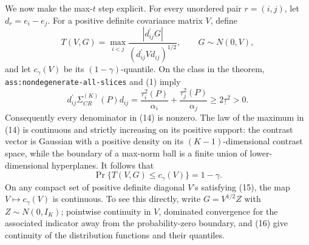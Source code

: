 We now make the max-\(t\) step explicit.  For every unordered pair \(r=(i,j)\), let \(d_r=e_i-e_j\).  For a positive definite covariance matrix \(V\), define
\[
 T(V,G)=\max_{i<j}\frac{|d_{ij}^{\prime}G|}
                         {(d_{ij}^{\prime}Vd_{ij})^{1/2}},
 \qquad G\sim N(0,V),                                                         \tag{14}
\]
and let \(c_\gamma(V)\) be its \((1-\gamma)\)-quantile.  On the class in the theorem, \texttt{ass:nondegenerate-all-slices} and (1) imply
\[
 d_{ij}^{\prime}\Sigma_{CR}^{(K)}(P)d_{ij}
 =\frac{\tau_i^2(P)}{\alpha_i}+\frac{\tau_j^2(P)}{\alpha_j}
 \geq2\underline\tau^2>0.                                                    \tag{15}
\]
Consequently every denominator in (14) is nonzero.  The law of the maximum in (14) is continuous and strictly increasing on its positive support: the contrast vector is Gaussian with a positive density on its \((K-1)\)-dimensional contrast space, while the boundary of a max-norm ball is a finite union of lower-dimensional hyperplanes.  It follows that
\[
 \Pr\{T(V,G)\leq c_\gamma(V)\}=1-\gamma.                                   \tag{16}
\]
On any compact set of positive definite diagonal \(V\)'s satisfying (15), the map \(V\mapsto c_\gamma(V)\) is continuous.  To see this directly, write \(G=V^{1/2}Z\) with \(Z\sim N(0,I_K)\); pointwise continuity in \(V\), dominated convergence for the associated indicator away from the probability-zero boundary, and (16) give continuity of the distribution functions and their quantiles.

